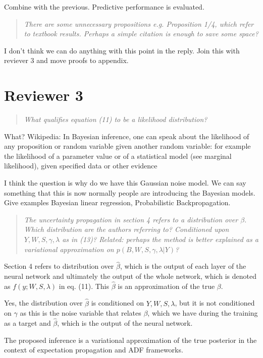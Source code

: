 \documentclass{article}
\begin{document}
Combine with the previous. Predictive performance is evaluated.

\begin{quote}
\textit{There are some unnecessary propositions e.g. Proposition 1/4, which refer to textbook results. Perhaps a simple citation is enough to save some space?}
\end{quote}
I don't think we can do anything with this point in the reply. Join this with reviever 3 and move proofs to appendix.

\section*{Reviewer 3}
\begin{quote}
\textit{What qualifies equation (11) to be a likelihood distribution?}
\end{quote}
What? Wikipedia: In Bayesian inference, one can speak about the likelihood of any proposition or random variable given another random variable: for example the likelihood of a parameter value or of a statistical model (see marginal likelihood), given specified data or other evidence

I think the question is why do we have this Gaussian noise model. We can say something that this is now normally people are introducing the Bayesian models. Give examples Bayesian linear regression, Probabilistic Backpropagation.

\begin{quote}
\textit{The uncertainty propagation in section 4 refers to a distribution over $\beta$. Which distribution are the authors referring to? Conditioned upon $Y,W,S,\gamma,\lambda$ as in (13)? Related: perhaps the method is better explained as a variational approximation on $p(B,W,S,\gamma,\lambda|Y)$?}
\end{quote}
Section 4 refers to distribution over $\widehat{\beta}$, which is the output of each layer of the neural network and ultimately the output of the whole network, which is denoted as $f(y; W, S, \lambda)$ in eq. (11). This $\widehat{\beta}$ is an approximation of the true $\beta$.

Yes, the distribution over $\widehat{\beta}$ is conditioned on $Y, W, S, \lambda$, but it is not conditioned on $\gamma$ as this is the noise variable that relates $\beta$, which we have during the training as a target and $\widehat{\beta}$, which is the output of the neural network.

The proposed inference is a variational approximation of the true posterior in the context of expectation propagation and ADF frameworks.
\end{document}
